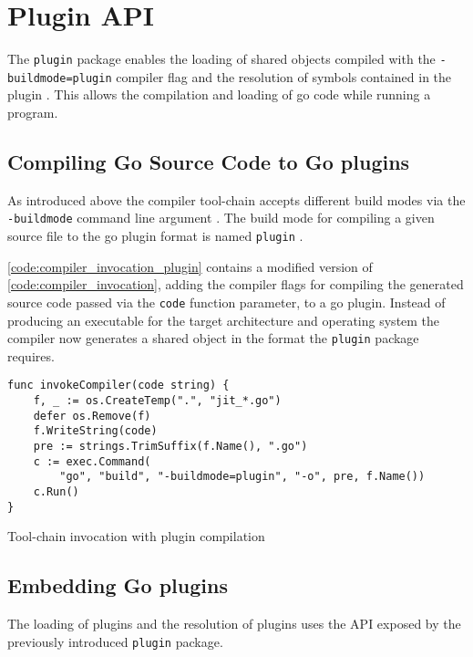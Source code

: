 \chapter{Plugin API}
\label{chapter:plugin-api}

The \texttt{plugin} package enables the loading of shared objects compiled with
the \newline \texttt{-buildmode=plugin} compiler flag and the resolution of
symbols contained in the plugin \cite[Overview]{go_plugin}. This allows the
compilation and loading of go code while running a program.

\section{Compiling Go Source Code to Go plugins}

As introduced above the compiler tool-chain accepts different build modes via
the \texttt{-buildmode} command line argument \cite{go_build_mode}. The build
mode for compiling a given source file to the go plugin format is named
\texttt{plugin} \cite{go_build_mode} \cite[Overview]{go_plugin}.

\autoref{code:compiler_invocation_plugin} contains a modified version of
\autoref{code:compiler_invocation}, adding the compiler flags for compiling the
generated source code passed via the \texttt{code} function parameter, to a go
plugin. Instead of producing an executable for the target architecture and
operating system the compiler now generates a shared object in the format the
\texttt{plugin} package requires.

\begin{listing}[H]
    \begin{verbatim}
func invokeCompiler(code string) {
    f, _ := os.CreateTemp(".", "jit_*.go")
    defer os.Remove(f)
    f.WriteString(code)
    pre := strings.TrimSuffix(f.Name(), ".go")
    c := exec.Command(
        "go", "build", "-buildmode=plugin", "-o", pre, f.Name())
    c.Run()
}
    \end{verbatim}
    \caption{Tool-chain invocation with plugin compilation}
    \label{code:compiler_invocation_plugin}
\end{listing}

\section{Embedding Go plugins}

The loading of plugins and the resolution of plugins uses the API exposed by
the previously introduced \texttt{plugin} package.

